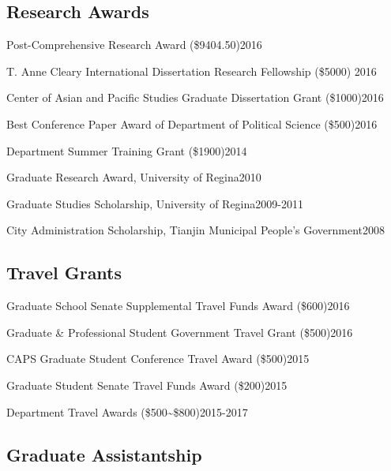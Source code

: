 \documentclass[10.5pt,]{article}
\providecommand{\tightlist}{%
  \setlength{\itemsep}{0pt}\setlength{\parskip}{0pt}}
\renewenvironment{itemize}{
  \begin{list}{}{
    \setlength{\leftmargin}{1.5em}
  }
}{
  \end{list}
}
\begin{document}
\subsection{Research Awards}\label{research-awards}

\begin{itemize}
\tightlist
\item
  Post-Comprehensive Research Award (\$9404.50)\hfill 2016
\item
  T. Anne Cleary International Dissertation Research Fellowship (\$5000)
  \hfill 2016
\item
  Center of Asian and Pacific Studies Graduate Dissertation Grant
  (\$1000)\hfill 2016
\item
  Best Conference Paper Award of Department of Political Science
  (\$500)\hfill 2016
\item
  Department Summer Training Grant (\$1900)\hfill 2014
\item
  Graduate Research Award, University of Regina\hfill 2010
\item
  Graduate Studies Scholarship, University of Regina\hfill 2009-2011
\item
  City Administration Scholarship, Tianjin Municipal People's
  Government\hfill 2008
\end{itemize}

\subsection{Travel Grants}\label{travel-grants}

\begin{itemize}
\tightlist
\item
  Graduate School Senate Supplemental Travel Funds Award
  (\$600)\hfill 2016
\item
  Graduate \& Professional Student Government Travel Grant
  (\$500)\hfill 2016
\item
  CAPS Graduate Student Conference Travel Award (\$500)\hfill 2015
\item
  Graduate Student Senate Travel Funds Award (\$200)\hfill 2015
\item
  Department Travel Awards (\$500\textasciitilde{}\$800)\hfill 2015-2017
\end{itemize}

\subsection{Graduate Assistantship}\label{graduate-assistantship}
\end{document}
